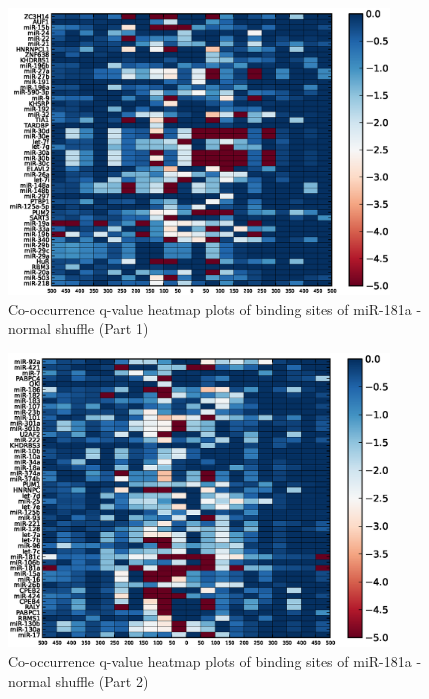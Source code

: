 \begin{figure}
   	\includegraphics[width=0.9\textwidth,clip]{appendix1/figures/miR-181a_normal_expressed_heatmap_qvalues0.eps}
   	\caption{Co-occurrence q-value heatmap plots of binding sites of miR-181a - normal shuffle (Part 1)}
\end{figure}
\clearpage
\begin{figure}
   	\includegraphics[width=0.9\textwidth,clip]{appendix1/figures/miR-181a_normal_expressed_heatmap_qvalues1.eps}
   	\caption{Co-occurrence q-value heatmap plots of binding sites of miR-181a - normal shuffle (Part 2)}
\end{figure}

